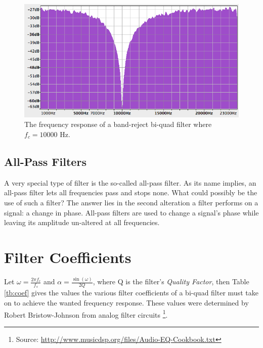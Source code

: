 \documentclass[12pt,twoside]{report}
\begin{document}
\begin{figure}[p!]
  \includegraphics[scale=0.6]{img/bandreject}
  \caption{The frequency response of a band-reject bi-quad filter where $f_{c} = 10000$ Hz.}
  \label{fig:bandreject}
\end{figure}

\pagebreak

\subsection{All-Pass Filters}

A very special type of filter is the so-called all-pass filter. As its name implies, an all-pass filter lets all frequencies pass and stops none. What could possibly be the use of such a filter? The answer lies in the second alteration a filter performs on a signal: a change in phase. All-pass filters are used to change a signal's phase while leaving its amplitude un-altered at all frequencies.

\section{Filter Coefficients}

Let $\omega = \frac{2\pi f_{c}}{f_{s}}$ and $\alpha = \frac{\sin(\omega)}{2Q}$, where Q is the filter's \emph{Quality Factor}\footnotemark{}, then Table \ref{tb:coef} gives the values the various filter coefficients of a bi-quad filter must take on to achieve the wanted frequency response. These values were determined by Robert Bristow-Johnson from analog filter circuits \footnote{Source: \url{http://www.musicdsp.org/files/Audio-EQ-Cookbook.txt}}.

\end{document}
